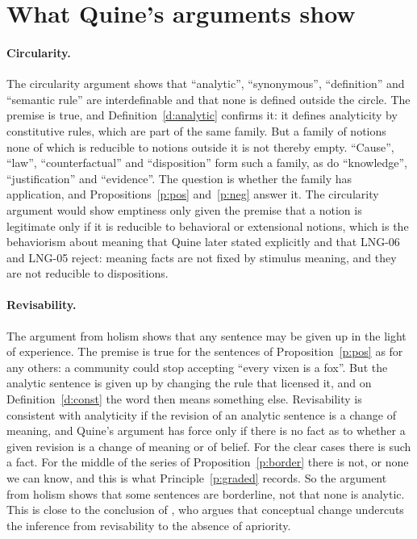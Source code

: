 \documentclass{situationist-preprint}
\begin{document}
\section{What Quine's arguments show}

\paragraph{Circularity.} The circularity argument shows that \enquote{analytic}, \enquote{synonymous}, \enquote{definition} and \enquote{semantic rule} are interdefinable and that none is defined outside the circle. The premise is true, and Definition~\ref{d:analytic} confirms it: it defines analyticity by constitutive rules, which are part of the same family. But a family of notions none of which is reducible to notions outside it is not thereby empty. \enquote{Cause}, \enquote{law}, \enquote{counterfactual} and \enquote{disposition} form such a family, as do \enquote{knowledge}, \enquote{justification} and \enquote{evidence}. The question is whether the family has application, and Propositions~\ref{p:pos} and~\ref{p:neg} answer it. The circularity argument would show emptiness only given the premise that a notion is legitimate only if it is reducible to behavioral or extensional notions, which is the behaviorism about meaning that Quine later stated explicitly \citep{Quine1960} and that LNG-06 and LNG-05 reject: meaning facts are not fixed by stimulus meaning, and they are not reducible to dispositions.

\paragraph{Revisability.} The argument from holism shows that any sentence may be given up in the light of experience. The premise is true for the sentences of Proposition~\ref{p:pos} as for any others: a community could stop accepting \enquote{every vixen is a fox}. But the analytic sentence is given up by changing the rule that licensed it, and on Definition~\ref{d:const} the word then means something else. Revisability is consistent with analyticity if the revision of an analytic sentence is a change of meaning, and Quine's argument has force only if there is no fact as to whether a given revision is a change of meaning or of belief. For the clear cases there is such a fact. For the middle of the series of Proposition~\ref{p:border} there is not, or none we can know, and this is what Principle~\ref{p:graded} records. So the argument from holism shows that some sentences are borderline, not that none is analytic. This is close to the conclusion of \citet{Chalmers2011}, who argues that conceptual change undercuts the inference from revisability to the absence of apriority.
\end{document}
